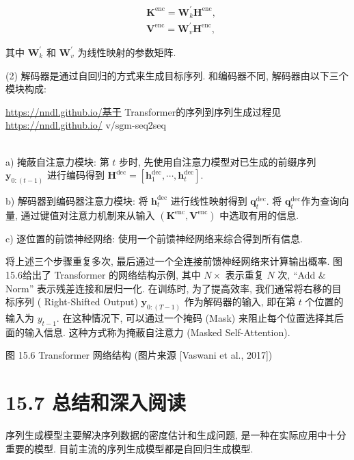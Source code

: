 \documentclass[10pt]{article}
\begin{document}
\begin{align*}
& \boldsymbol{K}^{\mathrm{enc}}=\boldsymbol{W}_{k}^{\prime} \boldsymbol{H}^{\mathrm{enc}},  \tag{15.118}\\
& \boldsymbol{V}^{\mathrm{enc}}=\boldsymbol{W}_{v}^{\prime} \boldsymbol{H}^{\mathrm{enc}}, \tag{15.119}
\end{align*}


其中 $\boldsymbol{W}_{k}^{\prime}$ 和 $\boldsymbol{W}_{v}^{\prime}$ 为线性映射的参数矩阵.

(2) 解码器是通过自回归的方式来生成目标序列. 和编码器不同, 解码器由以下三个模块构成:

\href{https://nndl.github.io/%E5%9F%BA%E4%BA%8E}{https://nndl.github.io/基于} Transformer的序列到序列生成过程见 \href{https://nndl.github.io/}{https://nndl.github.io/} $\mathrm{v} / \mathrm{sgm}$-seq2seq

\\
a) 掩蔽自注意力模块: 第 $t$ 步时, 先使用自注意力模型对已生成的前缀序列 $\boldsymbol{y}_{0:(t-1)}$ 进行编码得到 $\boldsymbol{H}^{\mathrm{dec}}=\left[\boldsymbol{h}_{1}^{\mathrm{dec}}, \cdots, \boldsymbol{h}_{t}^{\mathrm{dec}}\right]$.

b) 解码器到编码器注意力模块: 将 $\boldsymbol{h}_{t}^{\mathrm{dec}}$ 进行线性映射得到 $\boldsymbol{q}_{t}^{\mathrm{dec}}$. 将 $\boldsymbol{q}_{t}^{\mathrm{dec}}$作为查询向量, 通过键值对注意力机制来从输入 $\left(\boldsymbol{K}^{\mathrm{enc}}, \boldsymbol{V}^{\mathrm{enc}}\right)$ 中选取有用的信息.

c) 逐位置的前馈神经网络: 使用一个前馈神经网络来综合得到所有信息.

将上述三个步骤重复多次, 最后通过一个全连接前馈神经网络来计算输出概率. 图15.6给出了 Transformer 的网络结构示例, 其中 $N \times$ 表示重复 $N$ 次, “Add \& Norm” 表示残差连接和层归一化. 在训练时, 为了提高效率, 我们通常将右移的目标序列 ( Right-Shifted Output) $\boldsymbol{y}_{0:(T-1)}$ 作为解码器的输入, 即在第 $t$ 个位置的输入为 $y_{t-1}$. 在这种情况下, 可以通过一个掩码 (Mask) 来阻止每个位置选择其后面的输入信息. 这种方式称为掩蔽自注意力 (Masked Self-Attention).



图 15.6 Transformer 网络结构 (图片来源 [Vaswani et al., 2017])

\section*{15.7 总结和深入阅读}
序列生成模型主要解决序列数据的密度估计和生成问题, 是一种在实际应用中十分重要的模型. 目前主流的序列生成模型都是自回归生成模型.
\end{document}
